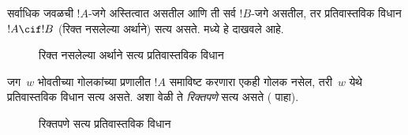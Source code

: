\documentclass[../../../include/open-logic-section]{subfiles}
\begin{document}


सर्वाधिक जवळची $!A$-जगे अस्तित्वात असतील आणि
ती सर्व $!B$-जगे असतील, तर प्रतिवास्तविक
विधान $!A \cif !B$
(रिक्त नसलेल्या अर्थाने) सत्य असते.
 मध्ये हे दाखवले आहे.
\begin{figure}
\begin{center}
\caption{रिक्त नसलेल्या अर्थाने सत्य प्रतिवास्तविक विधान}
\end{center}
\end{figure}
जग~$w$ भोवतीच्या गोलकांच्या
प्रणालीत $!A$ समाविष्ट
करणारा एकही गोलक नसेल,
तरी~$w$ येथे प्रतिवास्तविक
विधान सत्य असते. अशा वेळी
ते \emph{रिक्तपणे} सत्य
असते ( पाहा).
\begin{figure}
\begin{center}
\caption{रिक्तपणे सत्य प्रतिवास्तविक विधान}
\end{center}
\end{figure}
\end{document}
